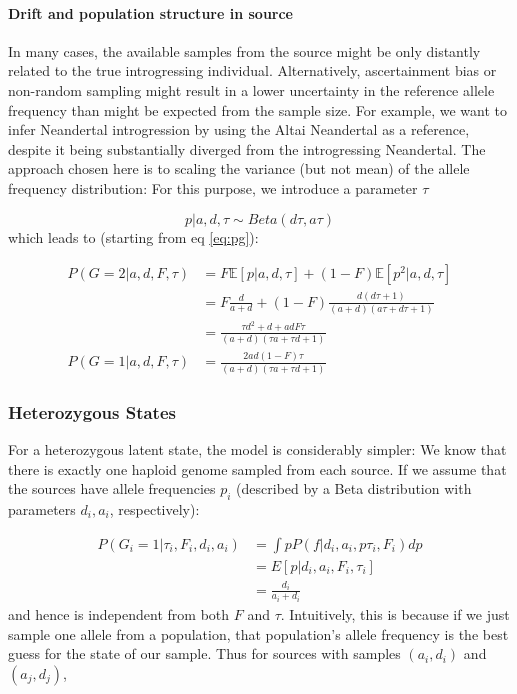 \documentclass[10pt,a4paper]{article}
\begin{document}
\paragraph{Drift and population structure in source}
In many cases, the available samples from the source might be only distantly related to the true introgressing individual. Alternatively, ascertainment bias or non-random sampling might result in a lower uncertainty in the reference allele frequency than might be expected from the sample size. For example, we want to infer Neandertal introgression by using the Altai Neandertal \citep{prufer2014} as a reference, despite it being substantially diverged from the introgressing Neandertal. The approach chosen here is to scaling the variance (but not mean) of the allele frequency distribution: For this purpose, we introduce a parameter $\tau$

\begin{equation}
p| a, d, \tau \sim Beta (d\tau, a\tau)  \nonumber
\end{equation}
which leads to (starting from eq \ref{eq:pg}):

\begin{subequations}

\begin{align}
P(G=2 | a,d, F, \tau) &= F \mathbb{E}[p|a,d, \tau] + (1-F)  \mathbb{E}[p^2|a, d, \tau]\nonumber\\
&= F \frac{d}{a+d} + (1-F)  \frac{d (d\tau+1)}{(a+d)(a\tau+d\tau+1)}\nonumber\\
&= \frac{\tau d^2 + d + adF\tau}{(a+d)(\tau a+\tau d+1)}\\
P(G=1 | a,d, F, \tau) &= \frac{2ad(1-F)\tau}{(a+d)(\tau a+\tau d+1)}
\end{align}
\end{subequations}


\subsubsection*{Heterozygous States}
For a heterozygous latent state, the model is considerably simpler: We know that there is exactly one haploid genome sampled from each source. If we assume that the sources have allele frequencies $p_i$ (described by a Beta distribution with parameters $d_i, a_i$, respectively):

\begin{align}
P(G_i = 1 | \tau_i, F_i, d_i, a_i) &=  \int p P(f| d_i, a_i, p \tau_i, F_i) dp\nonumber\\
&= E[p| d_i, a_i, F_i, \tau_i]\nonumber\\
&=\frac{d_i}{a_i+d_i}\label{eq:ll:het}
\end{align}
and hence is independent from both $F$ and $\tau$. Intuitively, this is because if we just sample one allele from a population, that population's allele frequency is the best guess for the state of our sample.
Thus for sources with samples $(a_i, d_i)$ and $(a_j, d_j)$,
\end{document}
